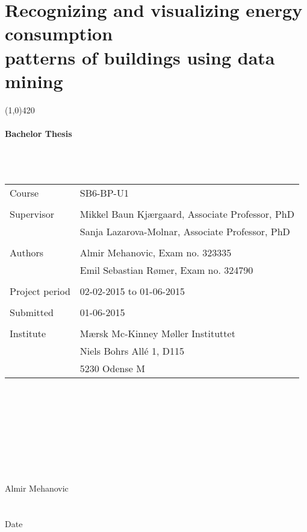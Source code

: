 \section*{Recognizing and visualizing energy consumption \\ patterns of buildings using data mining}
\begin{center}
\line(1,0){420}
\end{center}
\paragraph*{Bachelor Thesis} ~\\
\\
\begin{tabular}{l l}
Course & SB6-BP-U1 \\
&\\
Supervisor & Mikkel Baun Kjærgaard, Associate Professor, PhD\\
& Sanja Lazarova-Molnar, Associate Professor, PhD \\
& \\
Authors & Almir Mehanovic, Exam no. 323335 \\
& Emil Sebastian Rømer, Exam no. 324790 \\
& \\
Project period & 02-02-2015 to 01-06-2015\\
& \\
Submitted & 01-06-2015 \\
& \\
Institute & Mærsk Mc-Kinney Møller Instituttet \\
& Niels Bohrs Allé 1, D115 \\
& 5230 Odense M \\
\end{tabular}
\\
\\
\\
\\
\\
\\
\\
\makebox[2.5in]{\hrulefill} \hspace {1.0in}\makebox[2.5in]{\hrulefill} \\
Almir Mehanovic  
\\
\\
\makebox[1in]{\hrulefill} \hspace {2.5in}\makebox[1in]{\hrulefill} \\
Date 